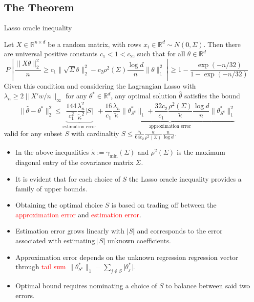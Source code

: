 \documentclass[10pt,handout,english]{beamer}
\newcommand{\R}{\mathbb{R}}
\begin{document}
\subsection{The Theorem}
\begin{frame}{Lasso oracle inequality}
\begin{theorem}
Let $X\in\R^{n\times d}$ be a random matrix, with rows $x_i\in\R^d\sim N(0,\Sigma)$. Then there are universal positive constants $c_1<1<c_2$, such that for all $\theta\in\R^d$
\[
P\left[\frac{\lVert X\theta\rVert_2^2}{n}\geq c_1\lVert\sqrt{\Sigma}\theta\rVert_2^2-c_2\rho^2(\Sigma)\frac{\log d}{n}\lVert\theta\rVert_1^2\right]\geq 1-\frac{\exp\left(-n/32 \right)}{1-\exp\left(-n/32 \right)}
\]
Given this condition and considering the Lagrangian Lasso with $\lambda_n\geq 2\lVert X'w/n\rVert_{\infty}$ for any $\theta^*\in\R^d$, any optimal solution $\hat{\theta}$ satisfies the bound
\[
\lVert\hat{\theta}-\theta^*\rVert_2^2\leq \underbrace{\frac{144}{c_1^2}\frac{\lambda_n^2}{\tilde{\kappa}^2}\lvert S\rvert}_{\text{estimation error}}+\underbrace{\frac{16}{c_1}\frac{\lambda_n}{\tilde{\kappa}}\lVert\theta_{S^c}^*\rVert_1+\frac{32c_2}{c_1}\frac{\rho^2(\Sigma)}{\tilde{\kappa}}\frac{\log d}{n}\lVert\theta_{S^c}^*\rVert_1^2}_{\text{approximation error}}
\]
valid for any subset $S$ with cardinaltiy $S\leq\frac{c_1}{64c_2}\frac{\tilde{\kappa}}{\rho^2(\Sigma)}\frac{n}{\log d}$.
\end{theorem}  
\end{frame}

\begin{frame}
\begin{itemize}
\item In the above inequalities $\tilde{\kappa}:=\gamma_{\min}(\Sigma)$ and $\rho^2(\Sigma)$ is the maximum diagonal entry of the covariance matrix $\Sigma$.

\item It is evident that for each choice of $S$ the Lasso oracle inequality provides a family of upper bounds.

\item Obtaining the optimal choice  $S$ is based on trading off between the \textcolor{red}{approximation error} and \textcolor{red}{estimation error}.

\item Estimation error grows linearly with $\lvert S\rvert$ and corresponds to the error associated with estimating $\lvert S\rvert$ unknown coefficients.

\item Approximation error depends on the unknown regression regression vector through \textcolor{red}{tail sum} $\lVert \theta_{S^c}^*\rVert_1=\sum_{j\notin S}\lvert \theta_j^*\rvert$.

\item Optimal bound requires nominating a choice of $S$ to balance between said two errors. 
\end{itemize}
\end{frame}
\end{document}
